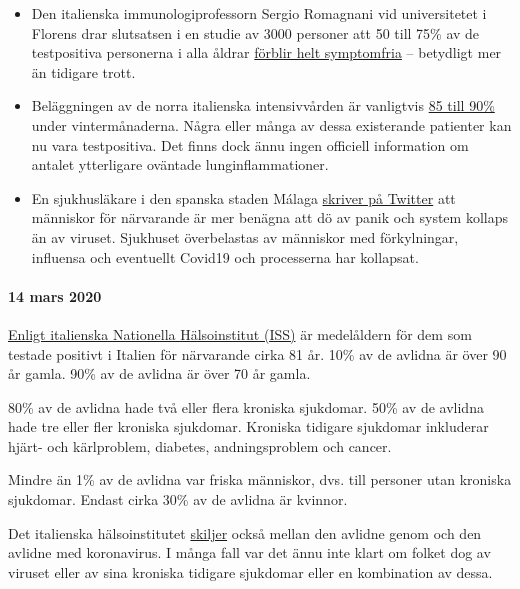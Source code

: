 \begin{itemize}
\tightlist
\item
  Den italienska immunologiprofessorn Sergio Romagnani vid universitetet
  i Florens drar slutsatsen i en studie av 3000 personer att 50 till
  75\% av de testpositiva personerna i alla åldrar
  \href{https://www.repubblica.it/salute/medicina-e-ricerca/2020/03/16/news/coronavirus_studio_il_50-75_dei_casi_a_vo_sono_asintomatici_e_molto_contagiosi-251474302/}{förblir
  helt symptomfria} -- betydligt mer än tidigare trott.
\item
  Beläggningen av de norra italienska intensivvården är vanligtvis
  \href{https://jamanetwork.com/journals/jama/fullarticle/2763188}{85
  till 90\%} under vintermånaderna. Några eller många av dessa
  existerande patienter kan nu vara testpositiva. Det finns dock ännu
  ingen officiell information om antalet ytterligare oväntade
  lunginflammationer.
\item
  En sjukhusläkare i den spanska staden Málaga
  \href{https://twitter.com/NeurologaenSAS/status/1239498772570308609}{skriver
  på Twitter} att människor för närvarande är mer benägna att dö av
  panik och system kollaps än av viruset. Sjukhuset överbelastas av
  människor med förkylningar, influensa och eventuellt Covid19 och
  processerna har kollapsat.
\end{itemize}

\hypertarget{14-mars-2020}{%
\paragraph{14 mars 2020}\label{14-mars-2020}}

\href{https://www.epicentro.iss.it/coronavirus/sars-cov-2-decessi-italia}{Enligt
italienska Nationella Hälsoinstitut (ISS)} är medelåldern för dem som
testade positivt i Italien för närvarande cirka 81 år. 10\% av de
avlidna är över 90 år gamla. 90\% av de avlidna är över 70 år gamla.

80\% av de avlidna hade två eller flera kroniska sjukdomar. 50\% av de
avlidna hade tre eller fler kroniska sjukdomar. Kroniska tidigare
sjukdomar inkluderar hjärt- och kärlproblem, diabetes, andningsproblem
och cancer.

Mindre än 1\% av de avlidna var friska människor, dvs. till personer
utan kroniska sjukdomar. Endast cirka 30\% av de avlidna är kvinnor.

Det italienska hälsoinstitutet
\href{https://youtu.be/0M4kbPDHGR0?t=210}{skiljer} också mellan den
avlidne genom och den avlidne med koronavirus. I många fall var det ännu
inte klart om folket dog av viruset eller av sina kroniska tidigare
sjukdomar eller en kombination av dessa.

